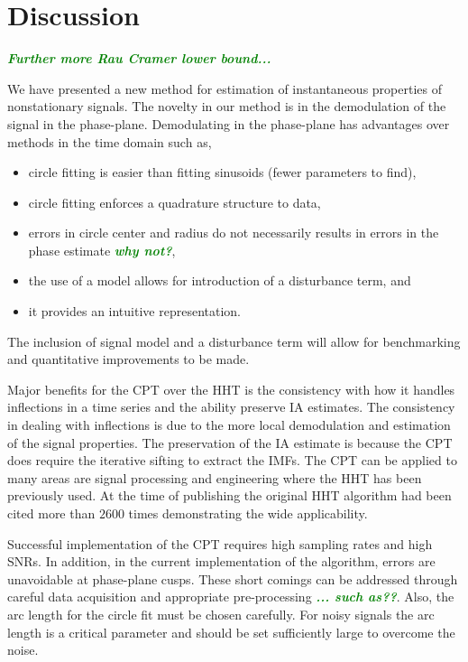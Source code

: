\documentclass[a4paper]{IEEEtran}
\newcommand{\dean}[1]{\textsf{\emph{\textbf{\textcolor{green}{#1}}}}}
\begin{document}
\section{Discussion}\label{sect:DiscussionSection}

\dean{Further more Rau Cramer lower bound...}

We have presented a new method for estimation of instantaneous properties of nonstationary signals. The novelty in our method is in the demodulation of the signal in the phase-plane. Demodulating in the phase-plane has advantages over methods in the time domain such as, 
\begin{itemize}
    \item circle fitting is easier than fitting sinusoids (fewer parameters to find),
    \item circle fitting enforces a quadrature structure to data,
    \item errors in circle center and radius do not necessarily results in errors in the phase estimate \dean{why not?},
    \item the use of a model  allows for introduction of a disturbance term, and
    \item it provides an intuitive representation.
\end{itemize}
The inclusion of signal model and a disturbance term will allow for benchmarking and quantitative improvements to be made.

Major benefits for the CPT over the HHT is the consistency with how it handles inflections in a time series and the ability preserve IA estimates. The consistency in dealing with inflections is due to the more local demodulation and estimation of the signal properties. The preservation of the IA estimate is because the CPT does require the iterative sifting to extract the IMFs. The CPT can be applied to many areas are signal processing and engineering where the HHT has been previously used. At the time of publishing the original HHT algorithm had been cited more than $2600$ times demonstrating the wide applicability.

Successful implementation of the CPT requires high sampling rates and high SNRs. In addition, in the current implementation of the algorithm, errors are unavoidable at phase-plane cusps. These short comings can be addressed through careful data acquisition and appropriate pre-processing \dean{... such as??}. Also, the arc length for the circle fit must be chosen carefully. For noisy signals the arc length is a critical parameter and should be set sufficiently large to overcome the noise. 
\end{document}
